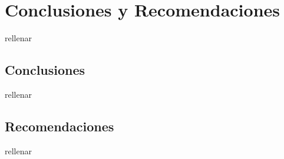 \chapter{Conclusiones y Recomendaciones}	
\label{ch:conclusiones}
rellenar

\section{Conclusiones}
rellenar

\section{Recomendaciones}
rellenar
